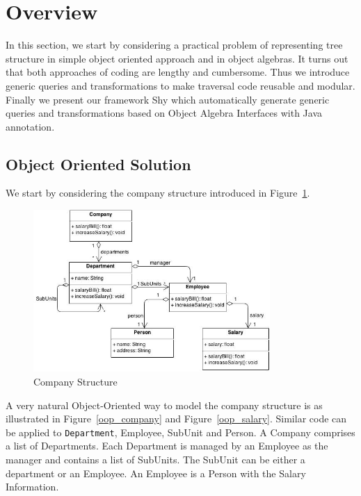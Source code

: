 \section{Overview}\label{subsec:overview}


In this section, we start by considering a practical problem of representing tree structure in simple object oriented approach and in object algebras. It turns out that both approaches of coding are lengthy and cumbersome. Thus we introduce generic queries and transformations to make traversal code reusable and modular. Finally we present our framework Shy which automatically generate generic queries and transformations based on Object Algebra Interfaces with Java annotation.

\subsection{Object Oriented Solution}


We start by considering the company structure introduced in
Figure~\ref{company_structure}.

\begin{figure}[ht!]
\centering
\includegraphics[width=90mm]{Company.jpg}
\caption{Company Structure \label{company_structure}}
\end{figure}

A very natural Object-Oriented way to model the company structure is
as illustrated in Figure~\ref{oop_company} and
Figure~\ref{oop_salary}. Similar code can be applied to
\lstinline{Department},
Employee, SubUnit and Person. A Company comprises a list of
Departments. Each Department is managed by an Employee as the manager
and contains a list of SubUnits. The SubUnit can be either a
department or an Employee. An Employee is a Person with the Salary
Information.

